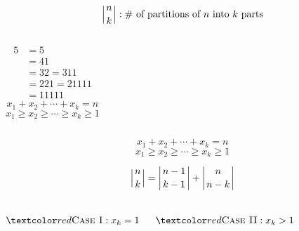 
\begin{frame}{}
  \[
    \left| n \atop k \right|: \# \text{ of partitions of $n$ into $k$ parts}
  \]

  \begin{columns}
    \pause
      \begin{align*}
        5 &= 5 \\[3pt]
          &= 4 1 \\[3pt]
          &= 3 2 = 3 1 1 \\[3pt]
          &= 2 2 1 = 2 1 1 1 1 \\[3pt]
          &= 1 1 1 1 1
      \end{align*}
    \pause
      \[
        x_1 + x_2 + \cdots + x_k = n
      \]
      \[
        x_1 \ge x_2 \ge \cdots \ge x_k \ge 1
      \]
  \end{columns}
\end{frame}

\begin{frame}{}
  \[
    x_1 + x_2 + \cdots + x_k = n
  \]
  \[
    x_1 \ge x_2 \ge \cdots \ge x_k \ge 1
  \]

  \begin{theorem}
    \[
      \left| n \atop k \right| = \left| n-1 \atop k-1 \right| + \left| n \atop n-k \right|
    \]
  \end{theorem}

  \pause
  \begin{columns}
    \[
      \red{\text{\textsc{Case I}}: x_k = 1}
    \]

      \[
        \red{\text{\textsc{Case II}}: x_k > 1}
      \]
  \end{columns}
\end{frame}

